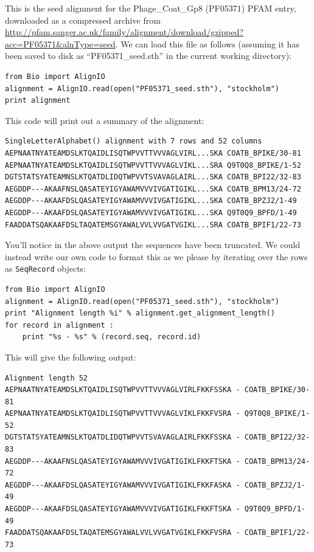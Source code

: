 \documentclass{report}
\begin{document}
This is the seed alignment for the Phage\_Coat\_Gp8 (PF05371) PFAM entry, downloaded as a compressed archive from \url{http://pfam.sanger.ac.uk/family/alignment/download/gzipped?acc=PF05371&alnType=seed}.  We can load this file as follows (assuming it has been saved to disk as ``PF05371\_seed.sth'' in the current working directory):

\begin{verbatim}
from Bio import AlignIO
alignment = AlignIO.read(open("PF05371_seed.sth"), "stockholm")
print alignment
\end{verbatim}

\noindent This code will print out a summary of the alignment:

\begin{verbatim}
SingleLetterAlphabet() alignment with 7 rows and 52 columns
AEPNAATNYATEAMDSLKTQAIDLISQTWPVVTTVVVAGLVIRL...SKA COATB_BPIKE/30-81
AEPNAATNYATEAMDSLKTQAIDLISQTWPVVTTVVVAGLVIKL...SRA Q9T0Q8_BPIKE/1-52
DGTSTATSYATEAMNSLKTQATDLIDQTWPVVTSVAVAGLAIRL...SKA COATB_BPI22/32-83
AEGDDP---AKAAFNSLQASATEYIGYAWAMVVVIVGATIGIKL...SKA COATB_BPM13/24-72
AEGDDP---AKAAFDSLQASATEYIGYAWAMVVVIVGATIGIKL...SKA COATB_BPZJ2/1-49
AEGDDP---AKAAFDSLQASATEYIGYAWAMVVVIVGATIGIKL...SKA Q9T0Q9_BPFD/1-49
FAADDATSQAKAAFDSLTAQATEMSGYAWALVVLVVGATVGIKL...SRA COATB_BPIF1/22-73
\end{verbatim}

You'll notice in the above output the sequences have been truncated.  We could instead write our own code to format this as we please by iterating over the rows as \verb|SeqRecord| objects:

\begin{verbatim}
from Bio import AlignIO
alignment = AlignIO.read(open("PF05371_seed.sth"), "stockholm")
print "Alignment length %i" % alignment.get_alignment_length()
for record in alignment :
    print "%s - %s" % (record.seq, record.id)
\end{verbatim}

\noindent This will give the following output:

\begin{verbatim}
Alignment length 52
AEPNAATNYATEAMDSLKTQAIDLISQTWPVVTTVVVAGLVIRLFKKFSSKA - COATB_BPIKE/30-81
AEPNAATNYATEAMDSLKTQAIDLISQTWPVVTTVVVAGLVIKLFKKFVSRA - Q9T0Q8_BPIKE/1-52
DGTSTATSYATEAMNSLKTQATDLIDQTWPVVTSVAVAGLAIRLFKKFSSKA - COATB_BPI22/32-83
AEGDDP---AKAAFNSLQASATEYIGYAWAMVVVIVGATIGIKLFKKFTSKA - COATB_BPM13/24-72
AEGDDP---AKAAFDSLQASATEYIGYAWAMVVVIVGATIGIKLFKKFASKA - COATB_BPZJ2/1-49
AEGDDP---AKAAFDSLQASATEYIGYAWAMVVVIVGATIGIKLFKKFTSKA - Q9T0Q9_BPFD/1-49
FAADDATSQAKAAFDSLTAQATEMSGYAWALVVLVVGATVGIKLFKKFVSRA - COATB_BPIF1/22-73
\end{verbatim}
\end{document}
